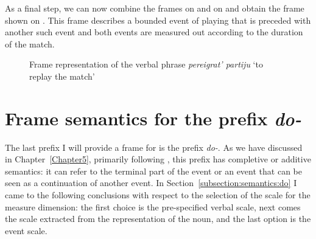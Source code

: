 As a final step, we can now combine the frames on  and on  and obtain the frame shown on . This frame describes a bounded event of playing that is preceded with another such event and both events are measured out according to the duration of the match. 

\begin{figure}\small
{}
\caption{Frame representation of the verbal phrase \textit{pereigrat' partiju} `to replay the match' \label{frame:pere:igrat:match}}
\end{figure}

\clearpage

\section{Frame semantics for the prefix \textit{do-}}\label{section:frame:do}
The last prefix I will provide a frame for is the prefix \textit{do-}. As we have discussed in Chapter~\ref{Chapter5}, primarily following \citet{Kagan:book}, this prefix has completive or additive semantics: it can refer to the terminal part of the event or an event that can be seen as a continuation of another event. In Section~\ref{subsection:semantics:do} I came to the following conclusions with respect to the selection of the scale for the measure dimension: the first choice is the pre-specified verbal scale, next comes the scale extracted from the representation of the noun, and the last option is the event scale. 

